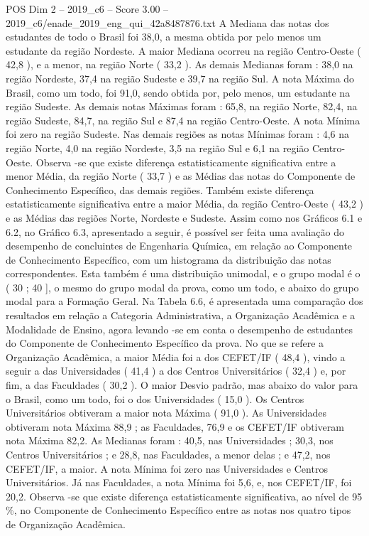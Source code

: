 \begin{textsample}{POS Dim 2 – 2019\_c6 – Score 3.00 – 2019\_c6/enade\_2019\_eng\_qui\_42a8487876.txt}
A Mediana das notas dos estudantes de todo o Brasil foi 38,0, a mesma obtida por pelo menos um estudante da região Nordeste.
A maior Mediana ocorreu na região Centro-Oeste ( 42,8 ), e a menor, na região Norte ( 33,2 ).
As demais Medianas foram : 38,0 na região Nordeste, 37,4 na região Sudeste e 39,7 na região Sul.
A nota Máxima do Brasil, como um todo, foi 91,0, sendo obtida por, pelo menos, um estudante na região Sudeste.
As demais notas Máximas foram : 65,8, na região Norte, 82,4, na região Sudeste, 84,7, na região Sul e 87,4 na região Centro-Oeste.
A nota Mínima foi zero na região Sudeste.
Nas demais regiões as notas Mínimas foram : 4,6 na região Norte, 4,0 na região Nordeste, 3,5 na região Sul e 6,1 na região Centro-Oeste.
Observa -se que existe diferença estatisticamente significativa entre a menor Média, da região Norte ( 33,7 ) e as Médias das notas do Componente de Conhecimento Específico, das demais regiões.
Também existe diferença estatisticamente significativa entre a maior Média, da região Centro-Oeste ( 43,2 ) e as Médias das regiões Norte, Nordeste e Sudeste.
Assim como nos Gráficos 6.1 e 6.2, no Gráfico 6.3, apresentado a seguir, é possível ser feita uma avaliação do desempenho de concluintes de Engenharia Química, em relação ao Componente de Conhecimento Específico, com um histograma da distribuição das notas correspondentes.
Esta também é uma distribuição unimodal, e o grupo modal é o ( 30 ; 40 ], o mesmo do grupo modal da prova, como um todo, e abaixo do grupo modal para a Formação Geral.
Na Tabela 6.6, é apresentada uma comparação dos resultados em relação a Categoria Administrativa, a Organização Acadêmica e a Modalidade de Ensino, agora levando -se em conta o desempenho de estudantes do Componente de Conhecimento Específico da prova.
No que se refere a Organização Acadêmica, a maior Média foi a dos CEFET/IF ( 48,4 ), vindo a seguir a das Universidades ( 41,4 ) a dos Centros Universitários ( 32,4 ) e, por fim, a das Faculdades ( 30,2 ).
O maior Desvio padrão, mas abaixo do valor para o Brasil, como um todo, foi o dos Universidades ( 15,0 ).
Os Centros Universitários obtiveram a maior nota Máxima ( 91,0 ).
As Universidades obtiveram nota Máxima 88,9 ; as Faculdades, 76,9 e os CEFET/IF obtiveram nota Máxima 82,2.
As Medianas foram : 40,5, nas Universidades ; 30,3, nos Centros Universitários ; e 28,8, nas Faculdades, a menor delas ; e 47,2, nos CEFET/IF, a maior.
A nota Mínima foi zero nas Universidades e Centros Universitários.
Já nas Faculdades, a nota Mínima foi 5,6, e, nos CEFET/IF, foi 20,2.
Observa -se que existe diferença estatisticamente significativa, ao nível de 95 \%, no Componente de Conhecimento Específico entre as notas nos quatro tipos de Organização Acadêmica.

\end{textsample}

